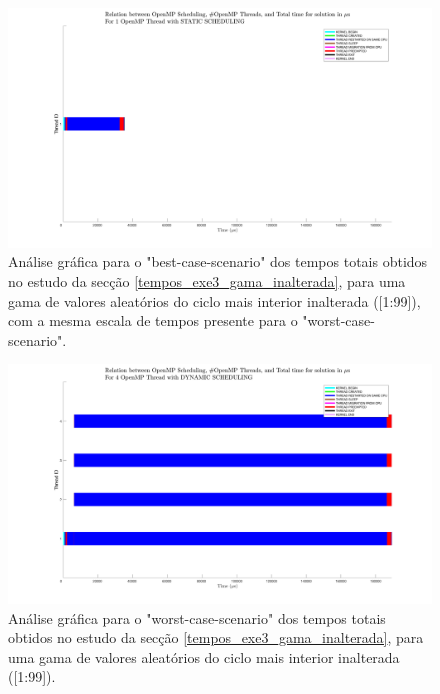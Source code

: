 \documentclass[a4paper]{article}
\begin{document}
  \newpage
  
  
     \begin{figure}[H]
    \centering
    \includegraphics[width=1\columnwidth]{PNG/best_static_1_thread_scaled.png}
        \caption{ Análise gráfica para o "best-case-scenario" dos tempos totais obtidos no estudo da secção \ref{tempos_exe3_gama_inalterada}, para uma gama de valores aleatórios do ciclo mais interior inalterada ([1:99]), com a mesma escala de tempos presente para o "worst-case-scenario". }
    \label{fig:best_static_1_thread_scaled}
    \end{figure}
    
           \begin{figure}[H]
    \centering
    \includegraphics[width=1\columnwidth]{PNG/worst_dynamic_4_threads.png}
        \caption{ Análise gráfica para o "worst-case-scenario" dos tempos totais obtidos no estudo da secção \ref{tempos_exe3_gama_inalterada}, para uma gama de valores aleatórios do ciclo mais interior inalterada ([1:99]). }
    \label{fig:worst_dynamic_4_threads_again}
    \end{figure}
    
\end{document}
